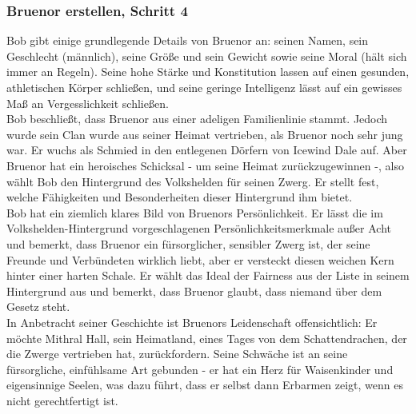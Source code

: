 \subsubsection{Bruenor erstellen, Schritt 4}
Bob gibt einige grundlegende Details von Bruenor an: seinen Namen, sein Geschlecht (männlich), seine Größe und sein Gewicht sowie seine Moral (hält sich immer an Regeln). Seine hohe Stärke und Konstitution lassen auf einen gesunden, athletischen Körper schließen, und seine geringe Intelligenz lässt auf ein gewisses Maß an Vergesslichkeit schließen.\\
Bob beschließt, dass Bruenor aus einer adeligen Familienlinie stammt. Jedoch wurde sein Clan wurde aus seiner Heimat vertrieben, als Bruenor noch sehr jung war. Er wuchs als Schmied in den entlegenen Dörfern von Icewind Dale auf. Aber Bruenor hat ein heroisches Schicksal - um seine Heimat zurückzugewinnen -, also wählt Bob den Hintergrund des Volkshelden für seinen Zwerg. Er stellt fest, welche Fähigkeiten und Besonderheiten dieser Hintergrund ihm bietet.\\
Bob hat ein ziemlich klares Bild von Bruenors Persönlichkeit. Er lässt die im Volkshelden-Hintergrund vorgeschlagenen Persönlichkeitsmerkmale außer Acht und bemerkt, dass Bruenor ein fürsorglicher, sensibler Zwerg ist, der seine Freunde und Verbündeten wirklich liebt, aber er versteckt diesen weichen Kern hinter einer harten Schale. Er wählt das Ideal der Fairness aus der Liste in seinem Hintergrund aus und bemerkt, dass Bruenor glaubt, dass niemand über dem Gesetz steht.\\
In Anbetracht seiner Geschichte ist Bruenors Leidenschaft offensichtlich: Er möchte Mithral Hall, sein Heimatland, eines Tages von dem Schattendrachen, der die Zwerge vertrieben hat, zurückfordern. Seine Schwäche ist an seine fürsorgliche, einfühlsame Art gebunden - er hat ein Herz für Waisenkinder und eigensinnige Seelen, was dazu führt, dass er selbst dann Erbarmen zeigt, wenn es nicht gerechtfertigt ist.\\

